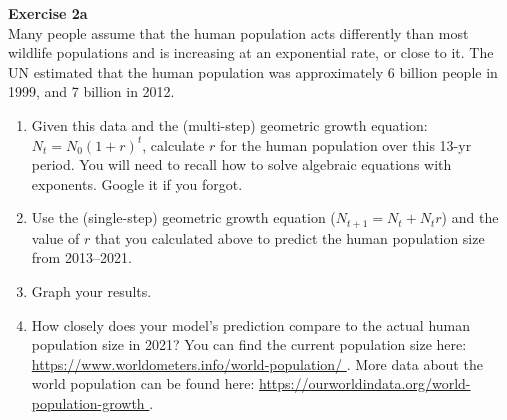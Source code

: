 \documentclass[12pt]{article}\usepackage[]{graphicx}\usepackage[]{color}
\begin{document}







{\bf Exercise 2a \\}
Many people assume that the human population acts differently than
most wildlife populations and is increasing at an exponential rate, or
close to it. The UN estimated that the human population was approximately 6
billion people in 1999, and 7 billion in 2012. 

\begin{enumerate}
  \item Given this data and the (multi-step) geometric growth equation:
    $N_t = N_0(1+r)^t$, calculate $r$ for the human population over
    this 13-yr period. You will need to recall how to solve algebraic
    equations with exponents. Google it if you forgot.
  \item Use the (single-step) geometric growth equation ($N_{t+1} = N_t + N_t r$)
    and the value of $r$ that you calculated above to predict the
    human population size from 2013--2021.
  \item Graph your results.
  \item How closely does your model's prediction compare to the actual
    human population size in 2021? You can find the current population
    size here: \url{
      https://www.worldometers.info/world-population/
    }. More data about the world population can be found here: \url{
      https://ourworldindata.org/world-population-growth      
    }.
\end{enumerate}
\end{document}
